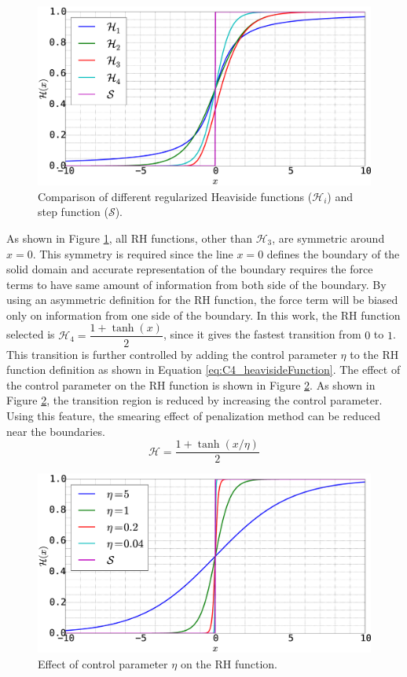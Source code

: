\begin{figure}[H]
    \centering
    \includegraphics[width=12.00cm]{Chapter_4/figure/heaviside_function_example.eps}
    \caption{Comparison of different regularized Heaviside functions ($\mathcal{H}_i$) and step function ($\mathcal{S}$).}
    \label{fig:C4_heavisideFunctionExample}
\end{figure}
%
As shown in Figure \ref{fig:C4_heavisideFunctionExample}, all RH functions, other than $\mathcal{H}_3$, are symmetric around $x = 0$. This symmetry is required since the line $x = 0$ defines the boundary of the solid domain and accurate representation of the boundary requires the force terms to have same amount of information from both side of the boundary. By using an asymmetric definition for the RH function, the force term will be biased only on information from one side of the boundary. In this work, the RH function selected is $\mathcal{H}_4 = \dfrac{1 + \tanh(x)}{2}$, since it gives the fastest transition from $0$ to $1$. This transition is further controlled by adding the control parameter $\eta$ to the RH function definition as shown in Equation \eqref{eq:C4_heavisideFunction}. The effect of the control parameter on the RH function is shown in Figure \ref{fig:C4_heavisideFunctionWithControlParamter}. As shown in Figure \ref{fig:C4_heavisideFunctionWithControlParamter}, the transition region is reduced by increasing the control parameter. Using this feature, the smearing effect of penalization method can be reduced near the boundaries.
%
\begin{equation}\label{eq:C4_heavisideFunction}
    \mathcal{H} = \frac{1 + \tanh(x / \eta)}{2}
\end{equation}
%
%
\begin{figure}[H]
    \centering
    \includegraphics[width=12.00cm]{Chapter_4/figure/heaviside_function_with_control.eps}
    \caption{Effect of control parameter $\eta$ on the RH function.}
    \label{fig:C4_heavisideFunctionWithControlParamter}
\end{figure}
